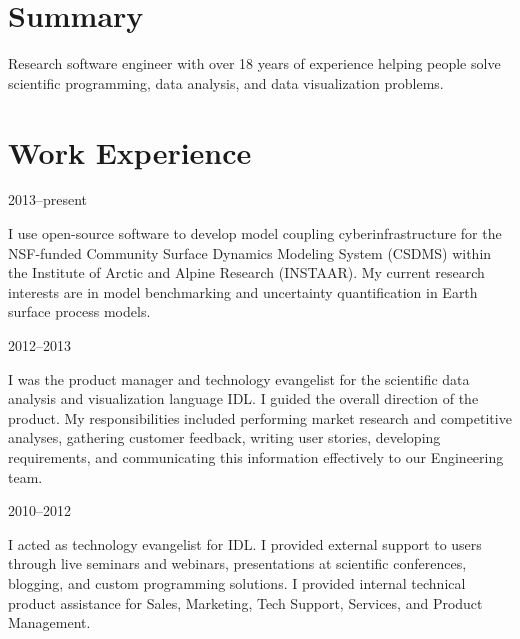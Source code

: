 \documentclass[letterpaper]{resume}
\begin{document}
\author{Mark Piper}

\maketitle


\section{Summary}

\vspace{0.5em}
\noindent 
Research software engineer
with over 18 years of experience
helping people solve
scientific programming, data analysis, and data visualization problems.


\section{Work Experience}

            {2013--present}
\begin{compactitem}[\itembullet]
  \item I use open-source software to develop model coupling
    cyberinfrastructure for the NSF-funded Community Surface Dynamics
    Modeling System (CSDMS) within the Institute of Arctic and Alpine
    Research (INSTAAR). My current research interests are in model
    benchmarking and uncertainty quantification in Earth surface
    process models.
\end{compactitem}

            {2012--2013}
\begin{compactitem}[\itembullet]
  \item I was the product manager and technology evangelist for the
    scientific data analysis and visualization language IDL. I guided
    the overall direction of the product. My responsibilities included
    performing market research and competitive analyses, gathering
    customer feedback, writing user stories, developing requirements,
    and communicating this information effectively to our Engineering
    team.
\end{compactitem}

            {2010--2012}
\begin{compactitem}[\itembullet]
  \item I acted as technology evangelist for IDL. I provided external
    support to users through live seminars and webinars, presentations
    at scientific conferences, blogging, and custom programming
    solutions. I provided internal technical product assistance for
    Sales, Marketing, Tech Support, Services, and Product Management.
\end{compactitem}
\end{document}
